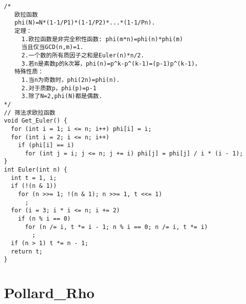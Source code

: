 \begin{lstlisting}
/*
   欧拉函数
   phi(N)=N*(1-1/P1)*(1-1/P2)*...*(1-1/Pn).
   定理：
     1.欧拉函数是非完全积性函数: phi(m*n)=phi(n)*phi(m)
     当且仅当GCD(n,m)=1.
     2.一个数的所有质因子之和是Euler(n)*n/2.
     3.若n是素数p的k次幂，phi(n)=p^k-p^(k-1)=(p-1)p^(k-1)，
   特殊性质：
     1.当n为奇数时，phi(2n)=phi(n).
     2.对于质数p，phi(p)=p-1
     3.除了N=2,phi(N)都是偶数.
*/
// 筛法求欧拉函数
void Get_Euler() {
  for (int i = 1; i <= n; i++) phi[i] = i;
  for (int i = 2; i <= n; i++)
    if (phi[i] == i)
      for (int j = i; j <= n; j += i) phi[j] = phi[j] / i * (i - 1);
}
int Euler(int n) {
  int t = 1, i;
  if (!(n & 1))
    for (n >>= 1; !(n & 1); n >>= 1, t <<= 1)
      ;
  for (i = 3; i * i <= n; i += 2)
    if (n % i == 0)
      for (n /= i, t *= i - 1; n % i == 0; n /= i, t *= i)
        ;
  if (n > 1) t *= n - 1;
  return t;
}
\end{lstlisting}

\section{Pollard\_Rho}

